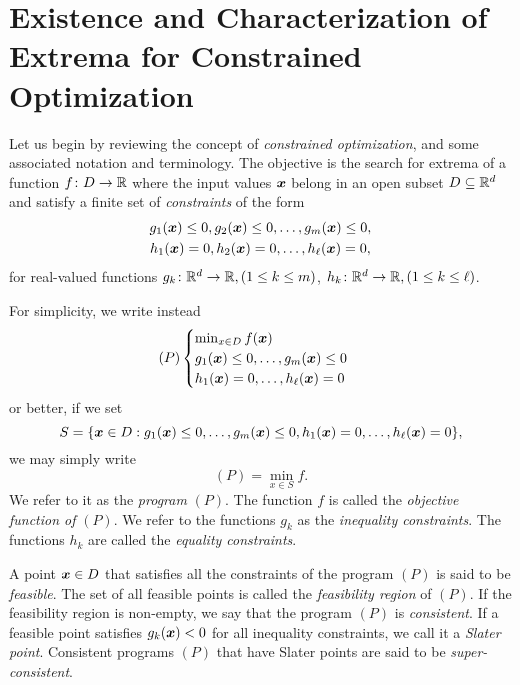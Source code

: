 
\chapter[Constrained Optimization]{Existence and Characterization of Extrema for Constrained Optimization}
\label{chapter:ConstrainedExistenceCharacterization}

Let us begin by reviewing the concept of \emph{constrained optimization}, and some associated notation and terminology.  The objective is the search for extrema of a function $f \colon D \to \mathbb{R}$ where the input values $\boldsymbol{x}$ belong in an open subset $D \subseteq \mathbb{R}^d$ and satisfy a finite set of \emph{constraints} of the form
\begin{gather*}
g_1(\boldsymbol{x}) \leq 0, g_2(\boldsymbol{x}) \leq 0, \dotsc, g_m(\boldsymbol{x}) \leq 0, \\
h_1(\boldsymbol{x}) = 0, h_2(\boldsymbol{x}) = 0, \dotsc, h_\ell(\boldsymbol{x}) = 0,
\end{gather*}
for real-valued functions $g_k\colon \mathbb{R}^d \to \mathbb{R}, (1\leq k \leq m)$, $h_k \colon \mathbb{R}^d \to \mathbb{R}, (1\leq k \leq \ell)$.

For simplicity, we write instead
\begin{equation}\label{equation:programP}
(P) \begin{cases} \min_{x\in D}f(\boldsymbol{x}) \\ g_1(\boldsymbol{x}) \leq 0, \dotsc, g_m(\boldsymbol{x}) \leq 0 \\ h_1(\boldsymbol{x}) = 0, \dotsc, h_\ell(\boldsymbol{x}) =0 \end{cases}
\end{equation}
or better, if we set 
\begin{equation*}
S = \{ \boldsymbol{x} \in D : g_1(\boldsymbol{x}) \leq 0, \dotsc, g_m(\boldsymbol{x}) \leq 0, h_1(\boldsymbol{x}) = 0, \dotsc, h_\ell(\boldsymbol{x})=0\},
\end{equation*} we may simply write 
\begin{equation*}
(P) = \min_{x\in S} f.
\end{equation*}
We refer to it as the \emph{program} $(P)$. The function $f$ is called the \emph{objective function of }$(P)$.  We refer to the functions $g_k$ as the \emph{inequality constraints}.  The functions $h_k$ are called the \emph{equality constraints}.

A point $\boldsymbol{x} \in D$ that satisfies all the constraints of the program $(P)$ is said to be \emph{feasible}.  The set of all feasible points is called the \emph{feasibility region} of $(P)$.  If the feasibility region is non-empty, we say that the program $(P)$ is \emph{consistent}. If a feasible point satisfies $g_k(\boldsymbol{x}) < 0$ for all inequality constraints, we call it a \emph{Slater point}. Consistent programs $(P)$ that have Slater points are said to be \emph{super-consistent}.

